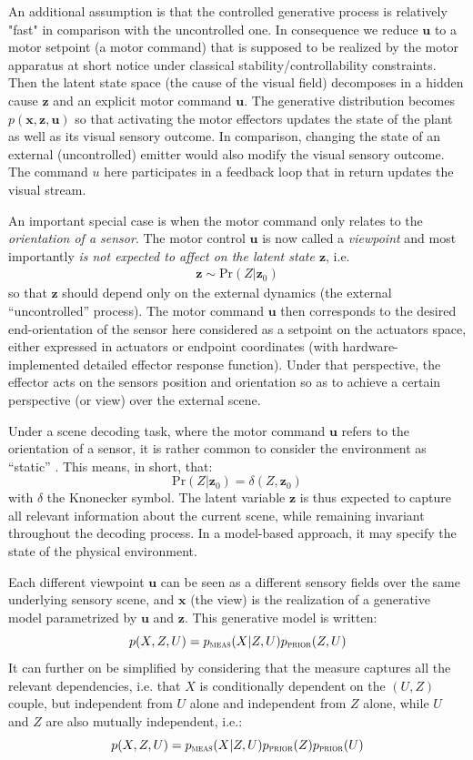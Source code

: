 \documentclass[12pt,twoside,openright]{article}
\begin{document}
An additional assumption is that the controlled generative process is relatively "fast" in comparison with the uncontrolled one. In consequence we reduce $\boldsymbol{u}$ to  a motor setpoint (a motor command) that is supposed to be realized by the motor apparatus at short notice under classical stability/controllability constraints.
Then the latent state space (the cause of the visual field) decomposes in a hidden cause $\boldsymbol{z}$ and an explicit motor command $\boldsymbol{u}$. 
The generative distribution becomes $p(\boldsymbol{x}, \boldsymbol{z}, \boldsymbol{u})$ so that activating the motor effectors updates the state of the plant as well as its visual sensory outcome. In comparison,  changing the state of an external (uncontrolled) emitter would also modify the visual sensory outcome. The command $u$ here participates in a feedback loop that in return updates the visual stream.

An important special case is when the motor command only relates to the \emph{orientation of a sensor}.  The motor control $\boldsymbol{u}$ is now called a \emph{viewpoint} and most importantly \emph{is not expected to affect on the latent state $\boldsymbol{z}$}, i.e.
\begin{align}
\boldsymbol{z} \sim \text{Pr}(Z|\boldsymbol{z}_0)
\end{align} 
so that $\boldsymbol{z}$ should depend only on the external dynamics (the external ``uncontrolled'' process).
The motor command $\boldsymbol{u}$ then corresponds to the desired end-orientation of the sensor here considered as a setpoint on the actuators space, either expressed in actuators or endpoint coordinates (with hardware-implemented detailed effector response function).  
Under that perspective, the effector acts on the sensors position and orientation so as to achieve a certain perspective (or view) over the external scene.

Under a scene decoding  task, where the motor command $\boldsymbol{u}$ refers to the orientation of a sensor, it is rather common to consider the environment as ``static'' \cite{butko2010infomax}. This means, in short, that:
$$\text{Pr}(Z|\boldsymbol{z}_0) = \delta(Z, \boldsymbol{z}_0)$$ 
with $\delta$ the Knonecker symbol. 
The latent variable $\boldsymbol{z}$ is thus expected to capture all relevant information about the current scene, while remaining invariant throughout the decoding process. In a model-based approach, it may specify the state of the physical environment. 

Each different viewpoint $\boldsymbol{u}$ can be seen as a different sensory fields over the same underlying sensory scene, and $\boldsymbol{x}$ (the view) is the realization of a generative model parametrized by $\boldsymbol{u}$ and $\boldsymbol{z}$. This generative model is written:
$$p(X, Z, U) = p_\text{\sc meas}(X| Z, U)p_\text{\sc prior}(Z, U)$$
It can further on be simplified by considering that the measure captures all the relevant dependencies, i.e. that $X$ is conditionally dependent on the $(U,Z)$ couple, but independent from $U$ alone and independent from $Z$ alone, while $U$ and $Z$ are also mutually independent, i.e.:
$$p(X, Z, U) = p_\text{\sc meas}(X| Z, U)p_\text{\sc prior}(Z) p_\text{\sc prior}(U)$$
\end{document}
